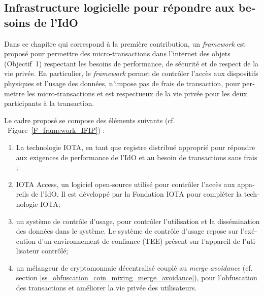 \begin{otherlanguage}{french}
\section*{Infrastructure logicielle pour répondre aux besoins de l'IdO}

Dans ce chapitre qui correspond à la première contribution, un \emph{framework} est proposé pour permettre des micro-transactions dans l'internet des objets (Objectif~1) respectant les besoins de performance, de sécurité et de respect de la vie privée. En particulier, le \emph{framework} permet de contrôler l'accès aux dispositifs physiques et l'usage des données, n'impose pas de frais de transaction, pour permettre les micro-transactions et est respectueux de la vie privée pour les deux participants à la transaction.

Le cadre proposé se compose des éléments suivants (cf. ~Figure~\ref{F_framework_IFIP}) :

\begin{enumerate}
\item La technologie IOTA, en tant que registre distribué approprié pour répondre aux exigences de performance de l'IdO et au besoin de transactions sans frais ;
\item IOTA Access, un logiciel open-source utilisé pour contrôler l'accès aux appareils de l'IdO. Il est développé par la Fondation IOTA pour compléter la technologie IOTA; 
\item un système de contrôle d'usage, pour contrôler l'utilisation et la dissémination des données dans le système. Le système de contrôle d'usage repose sur l'exécution d'un environnement de confiance (TEE) présent sur l'appareil de l'utilisateur contrôlé;
\item un mélangeur de cryptomonnaie décentralisé couplé au \emph{merge avoidance} (cf. section \ref{ss_obfuscation_coin_mixing_merge_avoidance}), pour l'obfuscation des transactions et améliorer la vie privée des utilisateurs.
\end{enumerate}


\end{otherlanguage}
